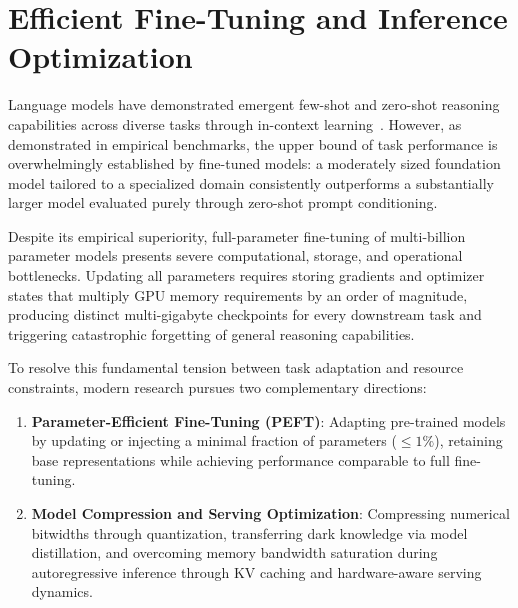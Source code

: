 \documentclass[../../../main.tex]{subfiles}
\begin{document}
\chapter{Efficient Fine-Tuning and Inference Optimization}
\label{ch:efficient_finetuning_inference_optimization}

Language models have demonstrated emergent few-shot and zero-shot reasoning capabilities across diverse tasks through in-context learning~\citep{brown2020, wei2022finetuned}. However, as demonstrated in empirical benchmarks, the upper bound of task performance is overwhelmingly established by fine-tuned models: a moderately sized foundation model tailored to a specialized domain consistently outperforms a substantially larger model evaluated purely through zero-shot prompt conditioning. 

Despite its empirical superiority, full-parameter fine-tuning of multi-billion parameter models presents severe computational, storage, and operational bottlenecks. Updating all parameters requires storing gradients and optimizer states that multiply GPU memory requirements by an order of magnitude, producing distinct multi-gigabyte checkpoints for every downstream task and triggering catastrophic forgetting of general reasoning capabilities. 

To resolve this fundamental tension between task adaptation and resource constraints, modern research pursues two complementary directions:
\begin{enumerate}
    \item \textbf{Parameter-Efficient Fine-Tuning (PEFT)}: Adapting pre-trained models by updating or injecting a minimal fraction of parameters ($\le 1\%$), retaining base representations while achieving performance comparable to full fine-tuning.
    \item \textbf{Model Compression and Serving Optimization}: Compressing numerical bitwidths through quantization, transferring dark knowledge via model distillation, and overcoming memory bandwidth saturation during autoregressive inference through KV caching and hardware-aware serving dynamics.
\end{enumerate}
\end{document}
